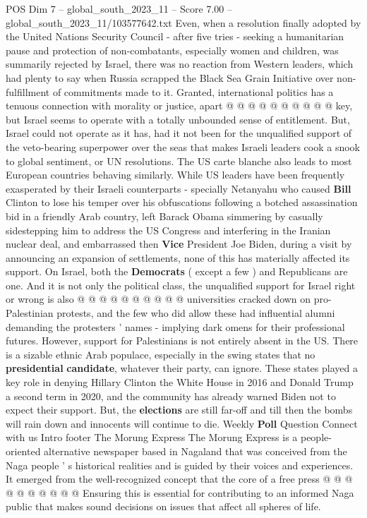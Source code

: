 \begin{textsample}{POS Dim 7 – global\_south\_2023\_11 – Score 7.00 – global\_south\_2023\_11/103577642.txt}
Even, when a resolution finally adopted by the United Nations Security Council - after five tries - seeking a humanitarian pause and protection of non-combatants, especially women and children, was summarily rejected by Israel, there was no reaction from Western leaders, which had plenty to say when Russia scrapped the Black Sea Grain Initiative over non-fulfillment of commitments made to it.
Granted, international politics has a tenuous connection with morality or justice, apart @ @ @ @ @ @ @ @ @ @ key, but Israel seems to operate with a totally unbounded sense of entitlement.
But, Israel could not operate as it has, had it not been for the unqualified support of the veto-bearing superpower over the seas that makes Israeli leaders cook a snook to global sentiment, or UN resolutions.
The US carte blanche also leads to most European countries behaving similarly.
While US leaders have been frequently exasperated by their Israeli counterparts - specially Netanyahu who caused \textbf{Bill} Clinton to lose his temper over his obfuscations following a botched assassination bid in a friendly Arab country, left Barack Obama simmering by casually sidestepping him to address the US Congress and interfering in the Iranian nuclear deal, and embarrassed then \textbf{Vice} President Joe Biden, during a visit by announcing an expansion of settlements, none of this has materially affected its support.
On Israel, both the \textbf{Democrats} ( except a few ) and Republicans are one.
And it is not only the political class, the unqualified support for Israel right or wrong is also @ @ @ @ @ @ @ @ @ @ universities cracked down on pro-Palestinian protests, and the few who did allow these had influential alumni demanding the protesters ' names - implying dark omens for their professional futures.
However, support for Palestinians is not entirely absent in the US.
There is a sizable ethnic Arab populace, especially in the swing states that no \textbf{presidential} \textbf{candidate}, whatever their party, can ignore.
These states played a key role in denying Hillary Clinton the White House in 2016 and Donald Trump a second term in 2020, and the community has already warned Biden not to expect their support.
But, the \textbf{elections} are still far-off and till then the bombs will rain down and innocents will continue to die.
Weekly \textbf{Poll} Question Connect with us Intro footer The Morung Express The Morung Express is a people-oriented alternative newspaper based in Nagaland that was conceived from the Naga people ' s historical realities and is guided by their voices and experiences.
It emerged from the well-recognized concept that the core of a free press @ @ @ @ @ @ @ @ @ @ Ensuring this is essential for contributing to an informed Naga public that makes sound decisions on issues that affect all spheres of life.

\end{textsample}
